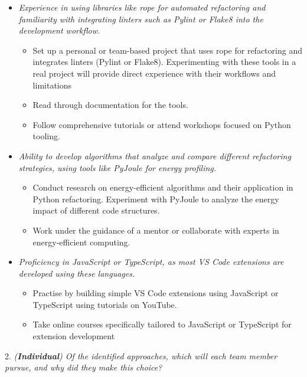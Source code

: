 \documentclass[12pt]{article}
\begin{document}
\begin{enumerate}[wide=0pt, leftmargin=*]
\begin{itemize}
      \item \textit{Experience in using libraries like rope for automated refactoring and familiarity with integrating linters such as Pylint or Flake8 into the development workflow.}
      \begin{itemize}
        \item Set up a personal or team-based project that uses rope for refactoring and integrates linters (Pylint or Flake8). Experimenting with these tools in a real project will provide direct experience with their workflows and limitations
        \item Read through documentation for the tools.
        \item Follow comprehensive tutorials or attend workshops focused on Python tooling.
      \end{itemize}
      
      \item \textit{Ability to develop algorithms that analyze and compare different refactoring strategies, using tools like PyJoule for energy profiling.}
      \begin{itemize}
        \item Conduct research on energy-efficient algorithms and their application in Python refactoring. Experiment with PyJoule to analyze the energy impact of different code structures.
        \item Work under the guidance of a mentor or collaborate with experts in energy-efficient computing.
      \end{itemize}

      \item \textit{Proficiency in JavaScript or TypeScript, as most VS Code extensions are developed using these languages.}
      \begin{itemize}
        \item Practise by building simple VS Code extensions using JavaScript or TypeScript using tutorials on YouTube.
        \item Take online courses specifically tailored to JavaScript or TypeScript for extension development
      \end{itemize}

    \end{itemize}
 
 
\end{enumerate}


2. \textit{(\textbf{Individual}) Of the identified approaches, which will each team member pursue, and why did they make this choice?}
\end{document}
